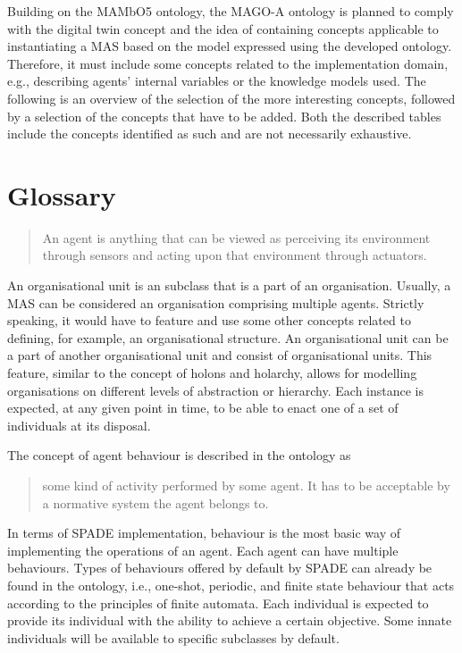 Building on the MAMbO5 ontology, the MAGO-A ontology is planned to comply with the digital twin concept and the idea of containing concepts applicable to instantiating a \ac{MAS} based on the model expressed using the developed ontology. Therefore, it must include some concepts related to the implementation domain, e.g., describing agents' internal variables or the knowledge models used. The following is an overview of the selection of the more interesting concepts, followed by a selection of the concepts that have to be added. Both the described tables include the concepts identified as such and are not necessarily exhaustive.


\section{Glossary}

\blockquote[{{\cite[p. 54]{russell2022ArtificialIntelligenceModern}}}]{An agent is anything that can be viewed as perceiving its environment through sensors and acting upon that environment through actuators.} 

 An organisational unit is an  subclass that is a part of an organisation. Usually, a \ac{MAS} can be considered an organisation comprising multiple agents. Strictly speaking, it would have to feature and use some other concepts related to defining, for example, an organisational structure. An organisational unit can be a part of another organisational unit and consist of organisational units. This feature, similar to the concept of holons and holarchy, allows for modelling organisations on different levels of abstraction or hierarchy. Each  instance is expected, at any given point in time, to be able to enact one of a set of  individuals at its disposal. 

 The concept of agent behaviour is described in the  ontology as \blockquote{\textelp{} some kind of activity performed by some agent. It has to be acceptable by a normative system the agent belongs to.} In terms of SPADE implementation, behaviour is the most basic way of implementing the operations of an agent. Each agent can have multiple behaviours. Types of behaviours offered by default by SPADE can already be found in the  ontology,
%
i.e., one-shot, periodic, and finite state behaviour that acts according to the principles of finite automata. Each  individual is expected to provide its  individual with the ability to achieve a certain objective. Some innate  individuals will be available to specific  subclasses by default.

